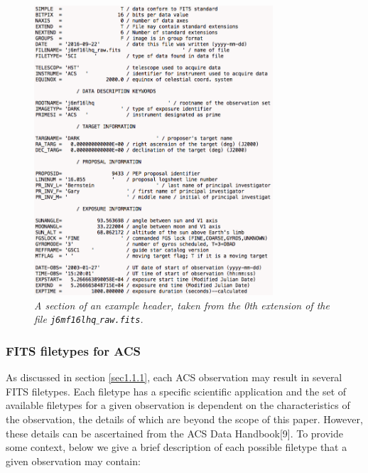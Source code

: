 \documentclass[10pt,journal,compsoc]{IEEEtran}
\begin{document}
\begin{figure}[!h]
\centering
\includegraphics[width=3.5in]{./figures/header_example.png}
\caption{\textit{A section of an example header, taken from the 0th extension of the file \texttt{j6mf16lhq$\_$raw.fits}.}}
\label{fig2}
\end{figure}


\subsubsection{FITS filetypes for ACS} \label{sec1.1.4}

As discussed in section \ref{sec1.1.1}, each ACS observation may result in several FITS filetypes. Each filetype has a specific scientific application and
the set of available filetypes for a given observation is dependent on the characteristics of the observation, the details of which are beyond the scope of this
paper.  However, these details can be ascertained from the ACS Data Handbook[9].  To provide some context, below we give a brief description of each possible
filetype that a given observation may contain:
\end{document}
